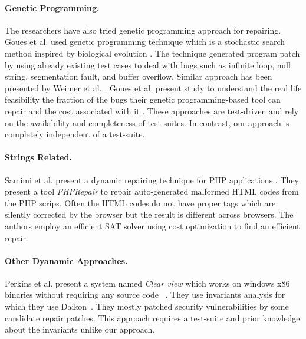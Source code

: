 \paragraph{Genetic Programming.}
The researchers have also tried genetic programming approach for repairing.
Goues et al. used genetic programming technique which is a stochastic search
method inspired by biological evolution \cite{GouesNFW12}. The technique generated program patch
by using already existing test cases to deal with bugs such as infinite loop, null
string, segmentation fault, and buffer overflow. Similar approach has been presented by 
Weimer et al. \cite{WeimerFGN10}. Goues et al. present study to understand the real life feasibility
the fraction of the bugs their genetic programming-based tool can repair and the cost associated
with it \cite{GouesDFW12}. These approaches are test-driven and rely on the availability and completeness of test-suites.
In contrast, our approach is completely independent of a test-suite.

\paragraph{Strings Related.}
Samimi et al. present a dynamic repairing technique for PHP applications  \cite{SamirniSAMTH12}.
They present a tool \textit{PHPRepair} to repair auto-generated
malformed HTML codes from the PHP scrips. Often the HTML codes do not have
proper tags which are silently corrected by the browser but the result is
different across browsers. The authors employ an efficient SAT solver
using cost optimization to find an efficient repair.

\paragraph{Other Dyanamic Approaches.}
Perkins et al. present a system named \emph{Clear view} which works on windows x86 binaries
without requiring any source code ~\cite{conf/sosp/PerkinsKLABCPSSSWZER09}.
They use invariants analysis for which they
use Daikon~\cite{DBLP:journals/scp/ErnstPGMPTX07}. They mostly patched security
vulnerabilities by some candidate repair patches. This approach requires a test-suite and
prior knowledge about the invariants unlike our approach.

